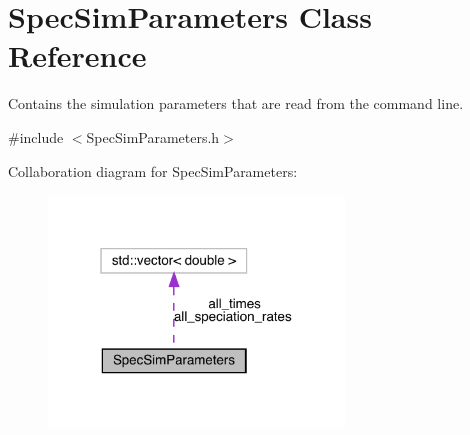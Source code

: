 \hypertarget{struct_spec_sim_parameters}{}\section{Spec\+Sim\+Parameters Class Reference}
\label{struct_spec_sim_parameters}


Contains the simulation parameters that are read from the command line.  




{\ttfamily \#include $<$Spec\+Sim\+Parameters.\+h$>$}



Collaboration diagram for Spec\+Sim\+Parameters\+:\nopagebreak
\begin{figure}[H]
\begin{center}
\leavevmode
\includegraphics[width=223pt]{struct_spec_sim_parameters__coll__graph}
\end{center}
\end{figure}
